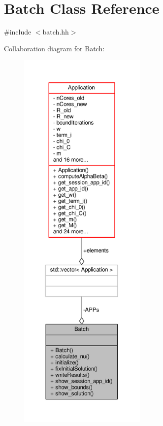 \hypertarget{classBatch}{\section{Batch Class Reference}
\label{classBatch}
}


{\ttfamily \#include $<$batch.\-hh$>$}



Collaboration diagram for Batch\-:\nopagebreak
\begin{figure}[H]
\begin{center}
\leavevmode
\includegraphics[height=550pt]{classBatch__coll__graph}
\end{center}
\end{figure}
